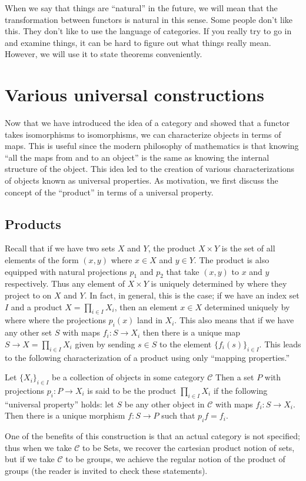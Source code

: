 When we say that things are ``natural'' in the future, we will mean that the
transformation between functors is natural in this sense.
Some people don't like this. They don't like to use the language of categories.
If you really try to go in and examine things, it can be hard to figure out
what things really mean.
However, we will use it to state theorems conveniently.



\section{Various universal constructions}

Now that we have introduced the idea of a category and showed that a functor
takes isomorphisms to isomorphisms, we can characterize objects in terms of
maps. This is useful since the modern philosophy of mathematics is that knowing
``all the maps from and to an object'' is the same as knowing the internal
structure of the object. This idea led to the creation of various
characterizations of objects known as universal properties.
As motivation, we first discuss the concept of the ``product'' in terms of a
universal property.

\subsection{Products}
Recall that if we have two sets $X$ and $Y$, the product $X\times Y$ is the set
of all elements of the form $(x,y)$ where $x\in X$ and $y\in Y$. The product is
also equipped with natural projections $p_1$ and $p_2$ that take $(x,y)$ to $x$
and $y$ respectively. Thus any element of $X\times Y$ is uniquely determined by
where they project to on $X$ and $Y$. In fact, in general, this is the case; if
we have an index set $I$ and a product $X=\prod_{i\in I} X_i$, then an element
$x\in X$ determined uniquely by where where the projections $p_i(x)$ land in
$X_i$. This also means that if we have any other set $S$ with maps
$f_i:S\rightarrow X_i$ then there is a unique map $S\rightarrow X=\prod_{i\in
I}X_i$ given by sending $s\in S$ to the element $\{ f_i(s)\}_{i\in I}$. This
leads to the following characterization of a product using only ``mapping
properties.''

\begin{definition} Let $\{X_i\}_{i\in I}$ be a collection of objects in some
category $\mathcal{C}$ Then a set $P$ with projections $p_i: P\rightarrow X_i$
is said to be the product $\prod_{i\in I} X_i$ if the following ``universal
property'' holds:
let $S$ be any other object in $\mathcal{C}$ with maps $f_i:S\rightarrow X_i$.
Then there is a unique morphism $f:S\rightarrow P$ such that $p_i f = f_i$.
\end{definition}
\begin{example} One of the benefits of this construction is that an actual
category is not specified; thus when we take $\mathcal{C}$ to be Sets, we
recover the cartesian product notion of sets, but if we take $\mathcal{C}$ to
be groups, we achieve the regular notion of the product of groups (the reader is
invited to check these statements). \end{example}

